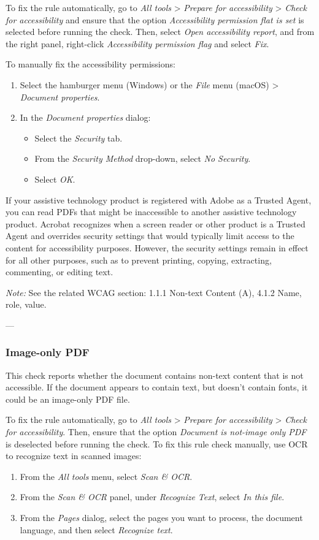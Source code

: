 To fix the rule automatically, go to \emph{All tools} > \emph{Prepare for accessibility} > \emph{Check for accessibility} and ensure that the option \emph{Accessibility permission flat is set} is selected before running the check. Then, select \emph{Open accessibility report}, and from the right panel, right-click \emph{Accessibility permission flag} and select \emph{Fix}.

To manually fix the accessibility permissions:
\begin{enumerate}
    \item Select the hamburger menu (Windows) or the \emph{File} menu (macOS) > \emph{Document properties}.
    \item In the \emph{Document properties} dialog:
    \begin{itemize}
        \item Select the \emph{Security} tab.
        \item From the \emph{Security Method} drop-down, select \emph{No Security}.
        \item Select \emph{OK}.
    \end{itemize}
\end{enumerate}
If your assistive technology product is registered with Adobe as a Trusted Agent, you can read PDFs that might be inaccessible to another assistive technology product. Acrobat recognizes when a screen reader or other product is a Trusted Agent and overrides security settings that would typically limit access to the content for accessibility purposes. However, the security settings remain in effect for all other purposes, such as to prevent printing, copying, extracting, commenting, or editing text\footnotemark[1].

\vspace{0.5em}
\noindent\textit{Note:} See the related WCAG section: 1.1.1 Non-text Content (A), 4.1.2 Name, role, value\cite{WCAG}.

---

\subsubsection{Image-only PDF}
This check reports whether the document contains non-text content that is not accessible. If the document appears to contain text, but doesn't contain fonts, it could be an image-only PDF file\cite{AdobeHelpX}.

To fix the rule automatically, go to \emph{All tools} > \emph{Prepare for accessibility} > \emph{Check for accessibility}. Then, ensure that the option \emph{Document is not-image only PDF} is deselected before running the check.
To fix this rule check manually, use OCR to recognize text in scanned images:
\begin{enumerate}
    \item From the \emph{All tools} menu, select \emph{Scan \& OCR}.
    \item From the \emph{Scan \& OCR} panel, under \emph{Recognize Text}, select \emph{In this file}.
    \item From the \emph{Pages} dialog, select the pages you want to process, the document language, and then select \emph{Recognize text}.
\end{enumerate}

